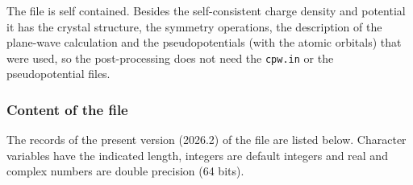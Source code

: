 \documentclass[11pt]{article}
\begin{document}
The file is self contained.  Besides the self-consistent charge density and potential
it has the crystal structure, the symmetry operations, the description of the plane-wave
calculation and the pseudopotentials (with the atomic orbitals) that were used,
so the post-processing does not need the \texttt{cpw.in} or the pseudopotential files.

\subsubsection*{Content of the file}

The records of the present version (2026.2) of the file are listed below.
Character variables have the indicated length, integers are default integers
and real and complex numbers are double precision (64 bits).
\end{document}
